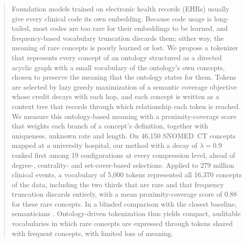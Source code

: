 \begin{abstract}
Foundation models trained on electronic health records (EHRs) usually give every clinical code its own embedding.
Because code usage is long-tailed, most codes are too rare for their embeddings to be learned, and frequency-based vocabulary truncation discards them; either way, the meaning of rare concepts is poorly learned or lost.
We propose a tokenizer that represents every concept of an ontology structured as a directed acyclic graph with a small vocabulary of the ontology's own concepts, chosen to preserve the meaning that the ontology states for them.
Tokens are selected by lazy greedy maximization of a semantic coverage objective whose credit decays with each hop, and each concept is written as a context tree that records through which relationship each token is reached.
We measure this ontology-based meaning with a proximity-coverage score that weights each branch of a concept's definition, together with uniqueness, unknown rate and length.
On 46,150 SNOMED~CT concepts mapped at a university hospital, our method with a decay of $\lambda = 0.9$ ranked first among 19 configurations at every compression level, ahead of degree-, centrality- and set-cover-based selections.
Applied to 279 million clinical events, a vocabulary of 5,000 tokens represented all 16,370 concepts of the data, including the two thirds that are rare and that frequency truncation discards entirely, with a mean proximity-coverage score of 0.88 for these rare concepts.
In a blinded comparison with the closest baseline, semanticians .
Ontology-driven tokenization thus yields compact, auditable vocabularies in which rare concepts are expressed through tokens shared with frequent concepts, with limited loss of meaning.
\end{abstract}
